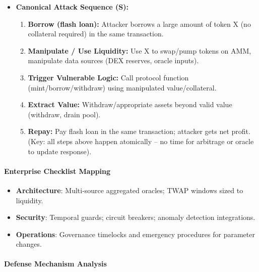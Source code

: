 \begin{itemize}
    \item \textbf{Canonical Attack Sequence (S):}
    \begin{enumerate}
        \item \textbf{Borrow (flash loan):} Attacker borrows a large amount of token X (no collateral required) in the same transaction.
        \item \textbf{Manipulate / Use Liquidity:} Use X to swap/pump tokens on AMM, manipulate data sources (DEX reserves, oracle inputs).
        \item \textbf{Trigger Vulnerable Logic:} Call protocol function (mint/borrow/withdraw) using manipulated value/collateral.
        \item \textbf{Extract Value:} Withdraw/appropriate assets beyond valid value (withdraw, drain pool).
        \item \textbf{Repay:} Pay flash loan in the same transaction; attacker gets net profit. (Key: all steps above happen atomically -- no time for arbitrage or oracle to update response).
    \end{enumerate}
\end{itemize}

\paragraph{Enterprise Checklist Mapping}
\begin{itemize}
    \item \textbf{Architecture}: Multi-source aggregated oracles; TWAP windows sized to liquidity.
    \item \textbf{Security}: Temporal guards; circuit breakers; anomaly detection integrations.
    \item \textbf{Operations}: Governance timelocks and emergency procedures for parameter changes.
\end{itemize}

\paragraph{Defense Mechanism Analysis}


